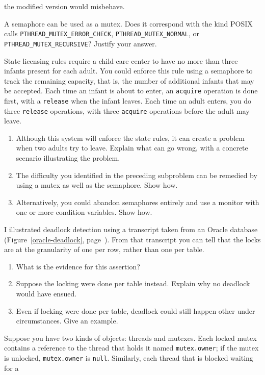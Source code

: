 \begin{chapterEnumerate}
the modified version would misbehave.
\item
A semaphore can be used as a mutex.  Does it correspond with the kind
POSIX calls \texttt{PTHREAD\_MUTEX\_ERROR\_CHECK}, \texttt{PTHREAD\_MUTEX\_NORMAL}, or
\texttt{PTHREAD\_MUTEX\_RECURSIVE}?  Justify your answer.
\item
State licensing rules require a child-care center to have no more than
three infants present for each adult.  You could enforce this rule
using a semaphore to track the remaining capacity, that is, the number of
additional infants that may be accepted.  Each time an infant is about
to enter,
an \verb|acquire| operation is done first, with a \verb|release| when the infant
leaves.  Each time an adult enters, you do three \verb|release| operations,
with three \verb|acquire| operations before the adult may leave.
\begin{enumerate}
\item
Although this system will enforce the state rules, it can create a
problem when two adults try to leave.  Explain what can go wrong, with
a concrete scenario illustrating the problem.
\item
The difficulty you identified in the preceding subproblem can be remedied by using a mutex as well
as the semaphore. Show how.
\item
Alternatively, you could abandon semaphores entirely and use a monitor
with one or more condition variables.  Show how.
\end{enumerate}
\item
I illustrated deadlock detection using a transcript taken from an
Oracle database (Figure~\ref{oracle-deadlock},
page~\pageref{oracle-deadlock}).  From that transcript you can tell
that the locks are at the granularity of one per row, rather
than one per table.
\begin{enumerate}
\item
What is the evidence for this assertion?
\item
Suppose the locking were done per table instead.  Explain why no
deadlock would have ensued.
\item
Even if locking were done per table, deadlock could still happen other
under circumstances.  Give an example.
\end{enumerate}
\item
Suppose you have two kinds of objects: threads and mutexes.  Each
locked mutex contains a reference to the thread that holds it named
\verb|mutex.owner|; if the mutex is unlocked, \verb|mutex.owner| is
\verb|null|.  Similarly, each thread that is blocked waiting for a

\end{chapterEnumerate}
